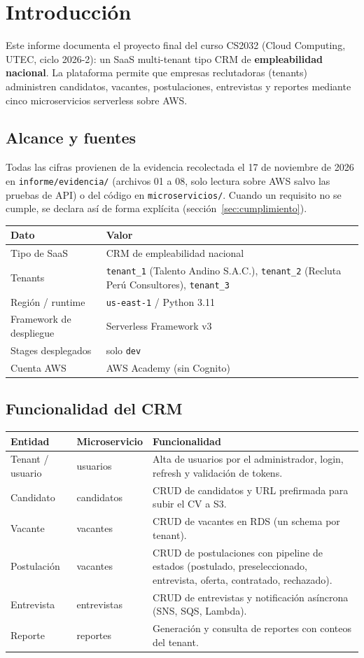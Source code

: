 \section{Introducción}
Este informe documenta el proyecto final del curso CS2032 (Cloud Computing, UTEC, ciclo 2026-2): un SaaS multi-tenant tipo CRM de \textbf{empleabilidad nacional}. La plataforma permite que empresas reclutadoras (tenants) administren candidatos, vacantes, postulaciones, entrevistas y reportes mediante cinco microservicios serverless sobre AWS.

\subsection{Alcance y fuentes}
Todas las cifras provienen de la evidencia recolectada el 17 de noviembre de 2026 en \texttt{informe/evidencia/} (archivos 01 a 08, solo lectura sobre AWS salvo las pruebas de API) o del código en \texttt{microservicios/}. Cuando un requisito no se cumple, se declara así de forma explícita (sección~\ref{sec:cumplimiento}).

\begin{tabular}{@{}ll@{}}
\toprule
Dato & Valor \\
\midrule
Tipo de SaaS & CRM de empleabilidad nacional \\
Tenants & \texttt{tenant\_1} (Talento Andino S.A.C.), \texttt{tenant\_2} (Recluta Perú Consultores), \texttt{tenant\_3} \\
Región / runtime & \texttt{us-east-1} / Python 3.11 \\
Framework de despliegue & Serverless Framework v3 \\
Stages desplegados & solo \texttt{dev} \\
Cuenta AWS & AWS Academy (sin Cognito) \\
\bottomrule
\end{tabular}

\subsection{Funcionalidad del CRM}
\begin{tabular}{@{}p{3cm}p{3.2cm}p{7.6cm}@{}}
\toprule
Entidad & Microservicio & Funcionalidad \\
\midrule
Tenant / usuario & usuarios & Alta de usuarios por el administrador, login, refresh y validación de tokens. \\
Candidato & candidatos & CRUD de candidatos y URL prefirmada para subir el CV a S3. \\
Vacante & vacantes & CRUD de vacantes en RDS (un schema por tenant). \\
Postulación & vacantes & CRUD de postulaciones con pipeline de estados (postulado, preseleccionado, entrevista, oferta, contratado, rechazado). \\
Entrevista & entrevistas & CRUD de entrevistas y notificación asíncrona (SNS, SQS, Lambda). \\
Reporte & reportes & Generación y consulta de reportes con conteos del tenant. \\
\bottomrule
\end{tabular}
